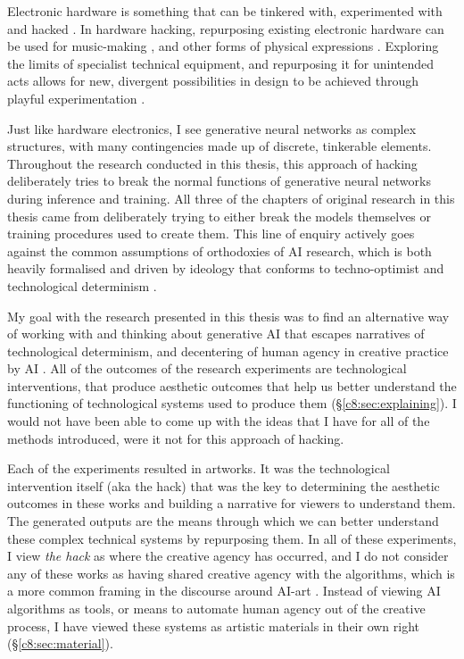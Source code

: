 Electronic hardware is something that can be tinkered with, experimented with and hacked \citep{collins2004hardware, grand2004hardware}. 
In hardware hacking, repurposing existing electronic hardware can be used for music-making \citep{collins2009handmade}, and other forms of physical expressions \citep{hartmann2008hacking}.
Exploring the limits of specialist technical equipment, and repurposing it for unintended acts allows for new, divergent possibilities in design to be achieved through playful experimentation \citep{goddard2015playful}.

Just like hardware electronics, I see generative neural networks as complex structures, with many contingencies made up of discrete, tinkerable elements.
Throughout the research conducted in this thesis, this approach of hacking deliberately tries to break the normal functions of generative neural networks during inference and training. 
All three of the chapters of original research in this thesis came from deliberately trying to either break the models themselves or training procedures used to create them.
This line of enquiry actively goes against the common assumptions of orthodoxies of AI research, which is both heavily formalised and driven by ideology \citep{sias2021ideology} that conforms to techno-optimist \citep{andreesen2023techno} and technological determinism \citep{drew2016technological}. 

My goal with the research presented in this thesis was to find an alternative way of working with and thinking about generative AI that escapes narratives of technological determinism, and decentering of human agency in creative practice by AI \citep{zeilinger2021tactical}.
All of the outcomes of the research experiments are technological interventions, that produce aesthetic outcomes that help us better understand the functioning of technological systems used to produce them (\S \ref{c8:sec:explaining}). 
I would not have been able to come up with the ideas that I have for all of the methods introduced, were it not for this approach of hacking.

Each of the experiments resulted in artworks.
It was the technological intervention itself (aka the hack) that was the key to determining the aesthetic outcomes in these works and building a narrative for viewers to understand them.
The generated outputs are the means through which we can better understand these complex technical systems by repurposing them.
In all of these experiments, I view \textit{the hack} as where the creative agency has occurred, and I do not consider any of these works as having shared creative agency with the algorithms, which is a more common framing in the discourse around AI-art \citep{moruzzi2022creative}.
Instead of viewing AI algorithms as tools, or means to automate human agency out of the creative process, I have viewed these systems as artistic materials in their own right (\S \ref{c8:sec:material}).

